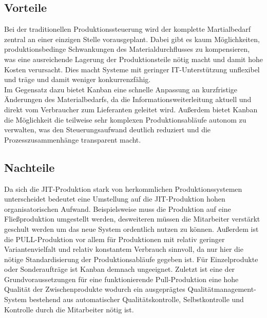 \documentclass[00_ToyotaProduktionssystem.tex]{subfiles}
\begin{document}
\subsection{Vorteile}
Bei der traditionellen Produktionssteuerung wird der komplette Martialbedarf zentral an einer einzigen Stelle vorausgeplant. Dabei gibt es kaum Möglichkeiten, produktionsbedinge Schwankungen des Materialdurchflusses zu kompensieren, was eine ausreichende Lagerung der Produktionsteile nötig macht und damit hohe Kosten verursacht. Dies macht Systeme mit geringer IT-Unterstützung unflexibel und träge und damit weniger konkurrenzfähig.\\
Im Gegensatz dazu bietet Kanban eine schnelle Anpassung an kurzfristige Änderungen des Materialbedarfs, da die Informationsweiterleitung aktuell und direkt vom Verbraucher zum Lieferanten geleitet wird. Außerdem bietet Kanban die Möglichkeit die teilweise sehr komplexen Produktionsabläufe autonom zu verwalten, was den Steuerungsaufwand deutlich reduziert und die Prozesszusammenhänge transparent macht.

\subsection{Nachteile}
Da sich die JIT-Produktion stark von herkommlichen Produktionssystemen unterscheidet bedeutet eine Umstellung auf die JIT-Produktion hohen organisatorischen Aufwand. Beispielsweise muss die Produktion auf eine Fließproduktion umgestellt werden, desweiteren müssen die Mitarbeiter verstärkt geschult werden um das neue System ordentlich nutzen zu können. Außerdem ist die PULL-Produktion vor allem für Produktionen mit relativ geringer Variantenvielfalt und relativ konstantem Verbrauch sinnvoll, da nur hier die nötige Standardisierung der Produktionsabläufe gegeben ist. Für Einzelprodukte oder Sonderaufträge ist Kanban demnach ungeeignet. Zuletzt ist eine der Grundvoraussetzungen für eine funktionierende Pull-Produktion eine hohe Qualität der Zwischenprodukte wodurch ein ausgeprägtes Qualitätmanagement-System bestehend aus automatischer Qualitätskontrolle, Selbstkontrolle und Kontrolle durch die Mitarbeiter nötig ist.
\end{document}
